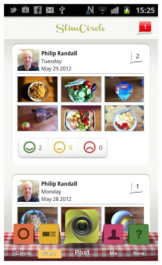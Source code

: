 \begin{enumerate}
\begin{figure}[h!t]
{\begin{subfigure}[b]{.33\textwidth}
{  \includegraphics[width=0.9\linewidth]{ch2/RelatedApps/MyFoodCircle/2.jpg}
  }
\end{subfigure}
\begin{subfigure}[b]{.33\textwidth}
  \centering
  \fbox{
}
\end{subfigure}}
\end{figure}
\end{enumerate}
